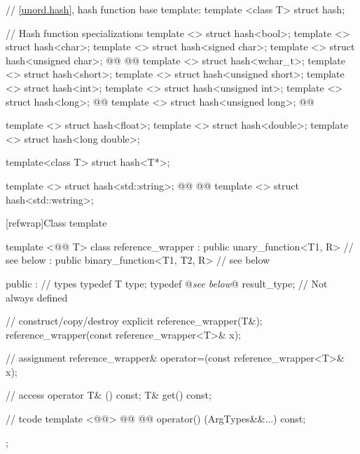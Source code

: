 \documentclass[american,twoside]{book}
\begin{document}
\begin{codeblock}
{  // \marktr{}\ref{unord.hash}, hash function base template:
  template <class T> struct hash;

  // Hash function specializations
  template <> struct hash<bool>;
  template <> struct hash<char>;
  template <> struct hash<signed char>;
  template <> struct hash<unsigned char>;
  @@
  @@
  template <> struct hash<wchar_t>;
  template <> struct hash<short>;
  template <> struct hash<unsigned short>;
  template <> struct hash<int>;
  template <> struct hash<unsigned int>;
  template <> struct hash<long>;
  @@
  template <> struct hash<unsigned long>;
  @@

  template <> struct hash<float>;
  template <> struct hash<double>;
  template <> struct hash<long double>;

  template<class T> struct hash<T*>;

  template <> struct hash<std::string>;
  @@
  @@
  template <> struct hash<std::wstring>;
}
\end{codeblock}

\setcounter{subsection}{4}
[refwrap]{\marktr{}Class template }

\begin{codeblock}
template <@@ T> class reference_wrapper 
  : public unary_function<T1, R>          // see below
  : public binary_function<T1, T2, R>     // see below
{ 
public :
  // types
  typedef T type;
  typedef @\textit{see below}@ result_type; // Not always defined

  // construct/copy/destroy
  explicit reference_wrapper(T&);
  reference_wrapper(const reference_wrapper<T>& x);

  // assignment
  reference_wrapper& operator=(const reference_wrapper<T>& x);

  // access
  operator T& () const;
  T& get() const;

  // tcode{}
  template <@@>
    @@
    @@
  operator() (ArgTypes&&...) const;
}; 
\end{codeblock}
\end{document}
